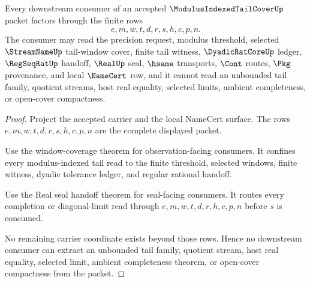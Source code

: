 \begin{theorem}
\label{thm:modulus-indexed-tail-cover-nonescape}
Every downstream consumer of an accepted $\ModulusIndexedTailCoverUp$ packet factors through the finite rows
$$
e,m,w,t,d,r,s,h,c,p,n.
$$
The consumer may read the precision request, modulus threshold, selected $\StreamNameUp$ tail-window cover, finite tail witness, $\DyadicRatCoreUp$ ledger, $\RegSeqRatUp$ handoff, $\RealUp$ seal, $\hsame$ transports, $\Cont$ routes, $\Pkg$ provenance, and local $\NameCert$ row, and it cannot read an unbounded tail family, quotient streams, host real equality, selected limits, ambient completeness, or open-cover compactness.
\end{theorem}
\begin{proof}
Project the accepted carrier and the local NameCert surface. The rows $e,m,w,t,d,r,s,h,c,p,n$ are the complete displayed packet.

Use the window-coverage theorem for observation-facing consumers. It confines every modulus-indexed tail read to the finite threshold, selected windows, finite witness, dyadic tolerance ledger, and regular rational handoff.

Use the Real seal handoff theorem for seal-facing consumers. It routes every completion or diagonal-limit read through $e,m,w,t,d,r,h,c,p,n$ before $s$ is consumed.

No remaining carrier coordinate exists beyond those rows. Hence no downstream consumer can extract an unbounded tail family, quotient stream, host real equality, selected limit, ambient completeness theorem, or open-cover compactness from the packet.
\end{proof}


